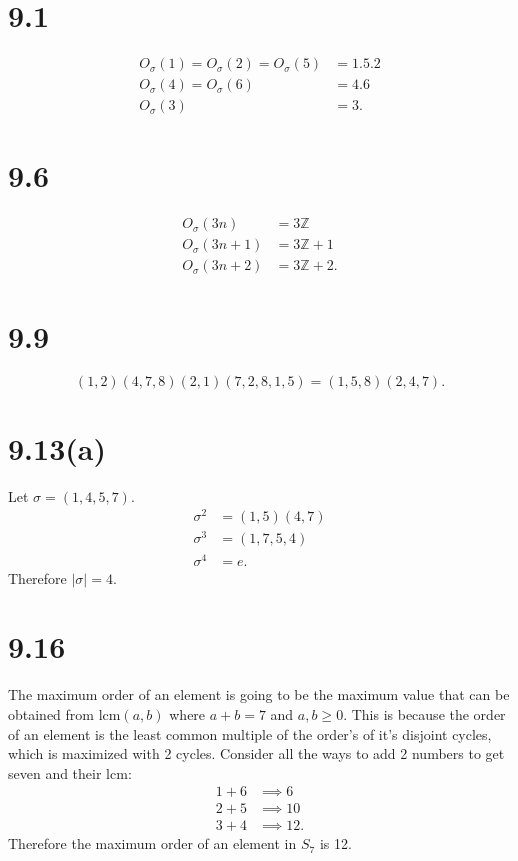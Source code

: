 \documentclass[12pt]{extarticle}
\begin{document}
\DeclarePairedDelimiter\bangle\langle\rangle


\section*{9.1}
\begin{align*}
	O_\sigma (1) = O_\sigma (2) = O_\sigma (5) &= \qty{1, 5, 2} \\
	O_\sigma (4) = O_\sigma (6) &=  \qty{4,6} \\
	O_\sigma (3) &= \qty{3}
.\end{align*}

\section*{9.6}
\begin{align*}
	O_\sigma (3n) &= 3 \mathbb{Z} \\
	O_\sigma (3n + 1) &= 3 \mathbb{Z} + 1 \\
	O_\sigma (3n + 2) &= 3 \mathbb{Z} + 2
.\end{align*}

\section*{9.9}
\[
	(1, 2)(4, 7, 8)(2, 1)(7, 2, 8, 1, 5) = (1, 5, 8) (2, 4, 7)
.\]

\section*{9.13(a)}
Let $\sigma = (1, 4, 5, 7)$.
\begin{align*}
	\sigma^2 &= (1,5) (4, 7) \\
	\sigma^3 &= (1, 7, 5, 4) \\
	\sigma^4 &= e 
.\end{align*}
Therefore $|\sigma| = 4$.

\section*{9.16}
The maximum order of an element is going to be the maximum value that can be obtained from $\text{lcm}(a,b)$ where $a + b = 7$ and $a,b \geq 0$. This is because the order of an element is the least common multiple of the order's of it's disjoint cycles, which is maximized with 2 cycles. Consider all the ways to add 2 numbers to get seven and their lcm:
\begin{align*}
	1 + 6 &\implies 6 \\
	2 + 5 &\implies 10 \\
	3 + 4 &\implies 12
.\end{align*}
Therefore the maximum order of an element in $S_7$ is 12.
\end{document}
